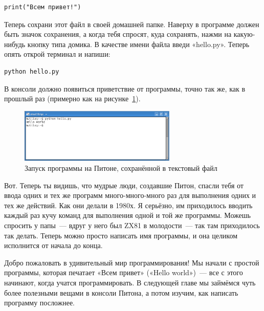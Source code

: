 \begin{verbatim}
print("Всем привет!")
\end{verbatim}

Теперь сохрани этот файл в своей домашней папке. Наверху в программе должен быть значок сохранения, а когда тебя спросят, куда сохранять, нажми на какую-нибудь кнопку типа домика. В качестве имени файла введи «hello.py». Теперь опять открой терминал и напиши:

\begin{verbatim}
python hello.py
\end{verbatim}

В консоли должно появиться приветствие от программы, точно так же, как в прошлый раз (примерно как на рисунке \ref{fig9}).

\begin{figure}
\begin{center}
\includegraphics[width=75mm]{../en/figure9.eps}
\end{center}
\caption{Запуск программы на Питоне, сохранённой в текстовый файл}\label{fig9}
\end{figure}

Вот. Теперь ты видишь, что мудрые люди, создавшие Питон, спасли тебя от ввода одних и тех же программ много-много-много раз для выполнения одних и тех же действий. Как они делали в 1980х. Я серьёзно, им приходилось вводить каждый раз кучу команд для выполнения одной и той же программы. Можешь спросить у папы — вдруг у него был ZX81 в молодости — так там приходилось так делать. Теперь можно просто написать имя программы, и она целиком исполнится от начала до конца.


Добро пожаловать в удивительный мир программирования!
Мы начали с простой программы, которая печатает «Всем привет» («Hello world») — все с этого начинают, когда учатся программировать. В следующей главе мы займёмся чуть более полезными вещами в консоли Питона, а потом изучим, как написать программу посложнее.
